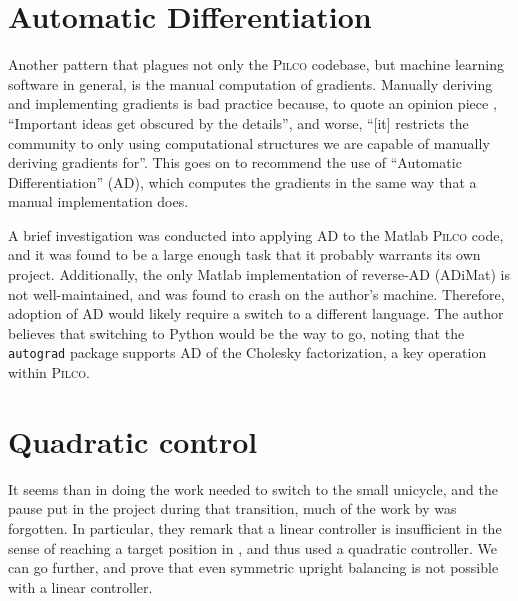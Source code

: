 \documentclass[main.tex]{subfiles}
\begin{document}
\section{Automatic Differentiation}

	Another pattern that plagues not only the \textsc{Pilco} codebase, but machine learning software in general, is the manual computation of gradients.
	Manually deriving and implementing gradients is bad practice because, to quote an opinion piece \cite{ad-criminal}, \enquote{Important ideas get obscured by the details}, and worse, \enquote{[it] restricts the community to only using computational structures we are capable of manually deriving gradients for}.
	This goes on to recommend the use of \enquote{Automatic Differentiation} (AD), which computes the gradients in the same way that a manual implementation does.

	A brief investigation was conducted into applying AD to the Matlab \textsc{Pilco} code, and it was found to be a large enough task that it probably warrants its own project. Additionally, the only Matlab implementation of reverse-AD (ADiMat) is not well-maintained, and was found to crash on the author's machine.
	Therefore, adoption of AD would likely require a switch to a different language.
	The author believes that switching to Python would be the way to go\footnotemark, noting that the \texttt{autograd} \cite{autograd} package supports AD of the Cholesky factorization, a key operation within \textsc{Pilco}.


	\section{Quadratic control}

	It seems than in doing the work needed to switch to the small unicycle, and the pause put in the project during that transition, much of the work by \citeauthor{queiro} was forgotten.
	In particular, they remark that a linear controller is insufficient in the sense of reaching a target position in \cite[fig.~8]{queiro}, and thus used a quadratic controller.
	We can go further, and prove that even symmetric upright balancing is not possible with a linear controller.
\end{document}
